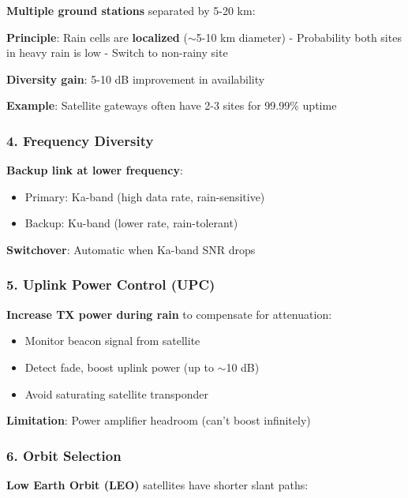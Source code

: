 \textbf{Multiple ground stations} separated by 5-20 km:

\textbf{Principle}: Rain cells are \textbf{localized}
($\sim$5-10 km diameter) - Probability both sites in heavy rain
is low - Switch to non-rainy site

\textbf{Diversity gain}: 5-10 dB improvement in availability

\textbf{Example}: Satellite gateways often have 2-3 sites for 99.99\%
uptime



\subsubsection{4. Frequency Diversity}

\textbf{Backup link at lower frequency}:

\begin{itemize}
\tightlist
\item
  Primary: Ka-band (high data rate, rain-sensitive)
\item
  Backup: Ku-band (lower rate, rain-tolerant)
\end{itemize}

\textbf{Switchover}: Automatic when Ka-band SNR drops



\subsubsection{5. Uplink Power Control (UPC)}

\textbf{Increase TX power during rain} to compensate for attenuation:

\begin{itemize}
\tightlist
\item
  Monitor beacon signal from satellite
\item
  Detect fade, boost uplink power (up to $\sim$10 dB)
\item
  Avoid saturating satellite transponder
\end{itemize}

\textbf{Limitation}: Power amplifier headroom (can't boost infinitely)



\subsubsection{6. Orbit Selection}

\textbf{Low Earth Orbit (LEO)} satellites have shorter slant paths:

